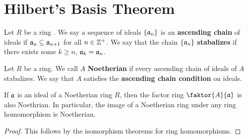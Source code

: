 \section{Hilbert's Basis Theorem}\label{section_1.4}

\begin{definition}
    Let $R$ be a ring . We say a sequence of ideals $\{\mathfrak{a}_n\}$ is an
    \textbf{ascending chain} of ideals if $\mathfrak{a}_n \subseteq \mathfrak{a}_{n+1}$ for all
    $n \in \mathbb{Z}^+$. We say that the chain  $\{\mathfrak{a}_n\}$ \textbf{stabalizes} if there
    exists some $k \geq n$, $\mathfrak{a}_k=\mathfrak{a}_n$.
\end{definition}

\begin{definition}
    Let $R$ be a ring. We call $A$ \textbf{Noetherian} if every ascending chain
    of ideals of $A$ stabalizes. We say that $A$ satisfies the \textbf{ascending
    chain condition} on ideals.
\end{definition}

\begin{lemma}\label{1.4.1}
    If $\mathfrak{a}$ is an ideal of a Noetherian ring $R$, then the factor ring
    $\faktor{A}{\af}$ is also Noethrian. In particular, the image of a Noetherian
    ring under any ring homomorphism is Noetherian.
\end{lemma}
\begin{proof}
    This follows by the isomorphism theorems for ring homomorphisms.
\end{proof}

